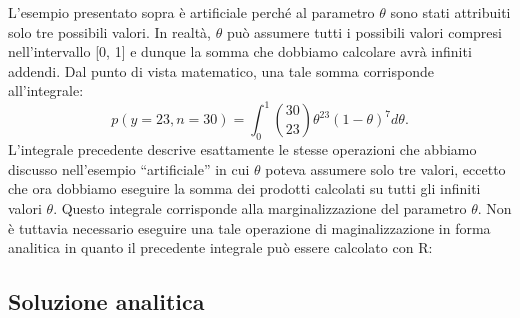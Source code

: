 \documentclass[
  11pt,
  italian,
  a4paper,
  extrafontsizes,onecolumn,openright
  ]{memoir}
\newenvironment{Shaded}{\begin{snugshade}}{\end{snugshade}}
\newcommand{\AttributeTok}[1]{\textcolor[rgb]{0.77,0.63,0.00}{#1}}
\newcommand{\CommentTok}[1]{\textcolor[rgb]{0.56,0.35,0.01}{\textit{#1}}}
\newcommand{\ControlFlowTok}[1]{\textcolor[rgb]{0.13,0.29,0.53}{\textbf{#1}}}
\newcommand{\DecValTok}[1]{\textcolor[rgb]{0.00,0.00,0.81}{#1}}
\newcommand{\FunctionTok}[1]{\textcolor[rgb]{0.00,0.00,0.00}{#1}}
\newcommand{\NormalTok}[1]{#1}
\newcommand{\OtherTok}[1]{\textcolor[rgb]{0.56,0.35,0.01}{#1}}
\newcommand{\SpecialCharTok}[1]{\textcolor[rgb]{0.00,0.00,0.00}{#1}}
\newcommand{\R}{\textsf{R}} %
\begin{document}
L'esempio presentato sopra è artificiale perché al parametro \(\theta\) sono stati attribuiti solo tre possibili valori. In realtà, \(\theta\) può assumere tutti i possibili valori compresi nell'intervallo {[}0, 1{]} e dunque la somma che dobbiamo calcolare avrà infiniti addendi. Dal punto di vista matematico, una tale somma corrisponde all'integrale:
\[
p(y = 23, n = 30) = \int_0^1 \binom{30}{23} \theta^{23} (1-\theta)^{7} d\theta.
\]
\noindent
L'integrale precedente descrive esattamente le stesse operazioni che abbiamo discusso nell'esempio ``artificiale'' in cui \(\theta\) poteva assumere solo tre valori, eccetto che ora dobbiamo eseguire la somma dei prodotti calcolati su tutti gli infiniti valori \(\theta\). Questo integrale corrisponde alla marginalizzazione del parametro \(\theta\). Non è tuttavia necessario eseguire una tale operazione di maginalizzazione in forma analitica in quanto il precedente integrale può essere calcolato con \R:

\begin{Shaded}
\end{Shaded}

\hypertarget{soluzione-analitica}{%
\subsection{Soluzione analitica}\label{soluzione-analitica}}
\end{document}
